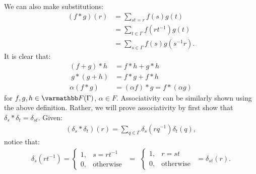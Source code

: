 \begin{example}
        We can also make substitutions:
            \begin{equation*}
            \begin{split}
                (f \ast g)(r)
                & = \sum_{st = r}f(s)g(t) \\
                & = \sum_{t \in \Gamma} f(rt^{-1})g(t) \\
                &  =\sum_{s \in \Gamma}f(s)g(s^{-1}r).
            \end{split}
            \end{equation*}
        It is clear that:
            \begin{equation*}
            \begin{split}
                (f+g)\ast h &= f \ast h + g \ast h \\\
                g \ast (g+h) &= f \ast g + f \ast h \\
                \alpha(f \ast g) &= (\alpha f)\ast g = f \ast (\alpha g)
            \end{split}
            \end{equation*}
        for $f,g,h \in \bfF(\Gamma)$, $\alpha \in F$. Associativity can be similarly shown using the above definition. Rather, we will prove associativity by first show that $\delta_s \ast \delta_t = \delta_{st}$. Given:
            \begin{equation*}
            \begin{split}
                (\delta_s \ast \delta_t)(r) = \sum_{q \in \Gamma} \delta_s(rq^{-1})\delta_t(q),
            \end{split}
            \end{equation*}
        notice that:
            \begin{equation*}
            \begin{split}
                \delta_s(rt^{-1}) = \begin{cases}
                    1, &s = rt^{-1} \\
                    0, &\text{otherwise}
                \end{cases}
                \hspace{5pt}=\hspace{5pt}
                \begin{cases}
                    1,& r = st \\
                    0 ,& \text{otherwise}
                \end{cases}
                \hspace{5pt} = \delta_{st}(r).

\end{split}
\end{equation*}
\end{example}
